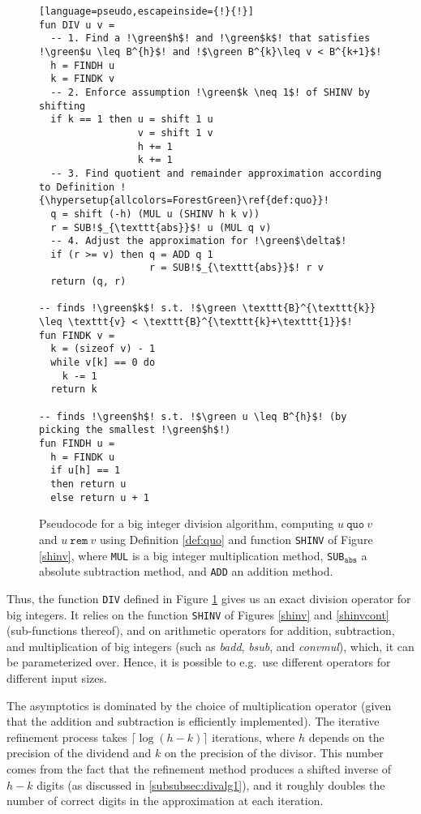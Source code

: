 \begin{figure}
\begin{lstlisting}[language=pseudo,escapeinside={!}{!}]
fun DIV u v =
  -- 1. Find a !\green$h$! and !\green$k$! that satisfies !\green$u \leq B^{h}$! and !$\green B^{k}\leq v < B^{k+1}$!
  h = FINDH u
  k = FINDK v
  -- 2. Enforce assumption !\green$k \neq 1$! of SHINV by shifting
  if k == 1 then u = shift 1 u
                 v = shift 1 v
                 h += 1
                 k += 1
  -- 3. Find quotient and remainder approximation according to Definition !{\hypersetup{allcolors=ForestGreen}\ref{def:quo}}!
  q = shift (-h) (MUL u (SHINV h k v))
  r = SUB!$_{\texttt{abs}}$! u (MUL q v)
  -- 4. Adjust the approximation for !\green$\delta$!
  if (r >= v) then q = ADD q 1
                   r = SUB!$_{\texttt{abs}}$! r v
  return (q, r)

-- finds !\green$k$! s.t. !$\green \texttt{B}^{\texttt{k}} \leq \texttt{v} < \texttt{B}^{\texttt{k}+\texttt{1}}$!
fun FINDK v =
  k = (sizeof v) - 1
  while v[k] == 0 do
    k -= 1
  return k

-- finds !\green$h$! s.t. !$\green u \leq B^{h}$! (by picking the smallest !\green$h$!)
fun FINDH u =
  h = FINDK u
  if u[h] == 1
  then return u
  else return u + 1
\end{lstlisting}
  \caption{\footnotesize Pseudocode for a big integer division algorithm, computing $u~\mathtt{quo}~v$ and $u~ \mathtt{rem}~ v$ using Definition \ref{def:quo} and function \texttt{SHINV} of Figure \ref{shinv}, where \texttt{MUL} is a big integer multiplication method, \texttt{SUB}$_{\mathtt{abs}}$ a absolute subtraction method, and \texttt{ADD} an addition method.}
  \label{div}
\end{figure}

Thus, the function \texttt{DIV} defined in Figure \ref{div} gives us an exact
division operator for big integers. It relies on the function \texttt{SHINV} of
Figures \ref{shinv} and \ref{shinvcont} (sub-functions thereof), and on
arithmetic operators for addition, subtraction, and multiplication of big
integers (such as \textit{badd}, \textit{bsub}, and \textit{convmul}), which, it
can be parameterized over. Hence, it is possible to e.g.\ use different
operators for different input sizes.

The asymptotics is dominated by the choice of multiplication operator (given
that the addition and subtraction is efficiently implemented). The iterative
refinement process takes $\lceil \log (h-k) \rceil$ iterations, where $h$ depends on the
precision of the dividend and $k$ on the precision of the divisor. This number
comes from the fact that the refinement method produces a shifted inverse of
$h-k$ digits (as discussed in \ref{subsubsec:divalg1}), and it roughly doubles
the number of correct digits in the approximation at each iteration.

